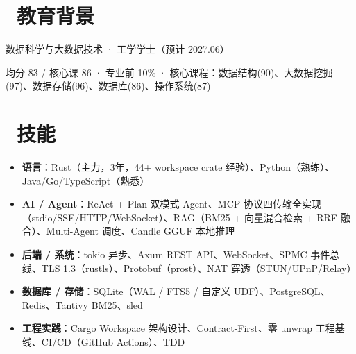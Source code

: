 \documentclass{resume}
\begin{document}



\section{\faGraduationCap\ 教育背景}
数据科学与大数据技术 · 工学学士（预计 2027.06）

均分 83 / 核心课 86 · 专业前 10\% · 核心课程：数据结构(90)、大数据挖掘(97)、数据存储(96)、数据库(86)、操作系统(87)

\section{\faCogs\ 技能}
\begin{itemize}[parsep=0.5ex]
  \item \textbf{语言}：Rust（主力，3年，44+ workspace crate 经验）、Python（熟练）、Java/Go/TypeScript（熟悉）
  \item \textbf{AI / Agent}：ReAct + Plan 双模式 Agent、MCP 协议四传输全实现（stdio/SSE/HTTP/WebSocket）、RAG（BM25 + 向量混合检索 + RRF 融合）、Multi-Agent 调度、Candle GGUF 本地推理
  \item \textbf{后端 / 系统}：tokio 异步、Axum REST API、WebSocket、SPMC 事件总线、TLS 1.3（rustls）、Protobuf（prost）、NAT 穿透（STUN/UPnP/Relay）
  \item \textbf{数据库 / 存储}：SQLite（WAL / FTS5 / 自定义 UDF）、PostgreSQL、Redis、Tantivy BM25、sled
  \item \textbf{工程实践}：Cargo Workspace 架构设计、Contract-First、零 unwrap 工程基线、CI/CD（GitHub Actions）、TDD
\end{itemize}
\end{document}
